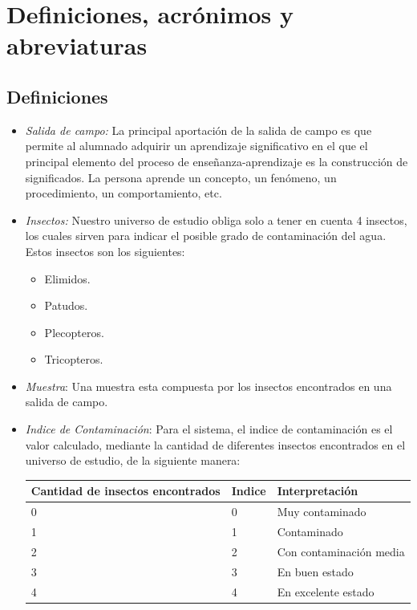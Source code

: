   \section{Definiciones, acrónimos y abreviaturas}

    \subsection{Definiciones}
      \begin{itemize}
        
        \item \emph{Salida de campo:} La principal aportación de la salida de campo es que permite al alumnado adquirir un aprendizaje significativo en el que el principal elemento del proceso de enseñanza-aprendizaje es la construcción de significados. La persona aprende un concepto, un fenómeno, un procedimiento, un comportamiento, etc.
        
        \item \emph{Insectos:} Nuestro universo de estudio obliga solo a tener en cuenta 4 insectos, los cuales sirven para indicar el posible grado de contaminación del agua. Estos insectos son los siguientes:
        
        \begin{itemize}
          \item Elimidos.
          \item Patudos.
          \item Plecopteros.
          \item Tricopteros.
        \end{itemize}
        
        \item \emph{Muestra}: Una muestra esta compuesta por los insectos encontrados en una salida de campo. 
        
        \item \emph{Indice de Contaminación}: Para el sistema, el indice de contaminación es el valor calculado, mediante la cantidad de diferentes insectos encontrados en el universo de estudio, de la siguiente manera:
        
        \begin{table}[H]
          \centering
          \begin{tabular}{|p{3.8cm}|l|l|}
            \hline
            \centering
            Cantidad de insectos encontrados  & Indice & Interpretación \\ \hline 
            0                     & 0 & Muy contaminado \\ \hline
            1                     & 1 & Contaminado \\ \hline
            2                     & 2 & Con contaminación media \\ \hline
            3                     & 3 & En buen estado \\ \hline
            4                     & 4 & En excelente estado \\ 
            \hline
          \end{tabular}
        \end{table}
        

\end{itemize}
